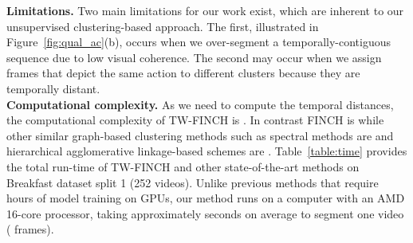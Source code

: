\documentclass[10pt,twocolumn,letterpaper]{article}
\begin{document}
\noindent\textbf{Limitations.} Two main limitations for our work exist, which are inherent to our unsupervised clustering-based approach. The first, illustrated in Figure~\ref{fig:qual_ac}(b), occurs when we over-segment a temporally-contiguous sequence due to low visual coherence. 
The second may occur when we assign frames that depict the same action to different clusters because they are temporally distant.\\


\noindent\textbf{Computational complexity.} As we need to compute the  temporal distances, the computational complexity of TW-FINCH is . In contrast FINCH is  while other similar graph-based clustering methods such as spectral methods are  and hierarchical agglomerative linkage-based schemes are .
Table~\ref{table:time} provides the total run-time of TW-FINCH and other state-of-the-art methods on Breakfast dataset split 1 (252 videos). Unlike previous methods that require hours of model training on GPUs, our method runs on a computer with an AMD 16-core processor, taking approximately  seconds on average to segment one video ( frames).




\begin{table}[t!]
\centering
{}
\caption{ Run-time comparison of method with other state-of-the-art methods on Breakfast dataset. 
Testing duration is measured as the average inference for split 1 test
set (252 videos).  The run-time of all the {\color{blue}{Weakly Sup.}} methods were taken from~\cite{mucon}   \label{table:time}}
\vspace{-0.3cm}

\end{table}
\end{document}

